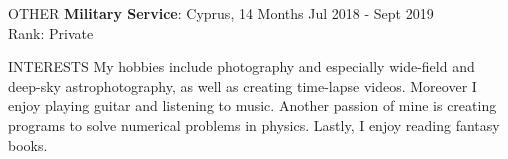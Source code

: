 \documentclass{resume} %
\begin{document}
\bigbreak

\begin{rSection}{OTHER}
{\bf Military Service}: Cyprus, 14 Months \hfill {Jul 2018 - Sept 2019}\\
Rank: Private
\end{rSection}

\bigbreak

\begin{rSection}{INTERESTS} 
My hobbies include photography and especially wide-field and deep-sky astrophotography, as well as creating time-lapse videos.
Moreover I enjoy playing guitar and listening to music.
Another passion of mine is creating programs to solve numerical problems in physics.
Lastly, I enjoy reading fantasy books.
\end{rSection}
\end{document}
